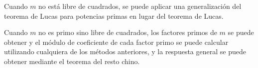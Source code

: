 Cuando $m$ no está libre de cuadrados, se puede aplicar una generalización del teorema de Lucas para potencias primas en lugar del teorema de Lucas.

Cuando $m$ no es primo sino libre de cuadrados, los factores primos de $m$ se puede obtener y el módulo de coeficiente de cada factor primo se puede calcular utilizando cualquiera de los métodos anteriores, y la respuesta general se puede obtener mediante el teorema del resto chino.


